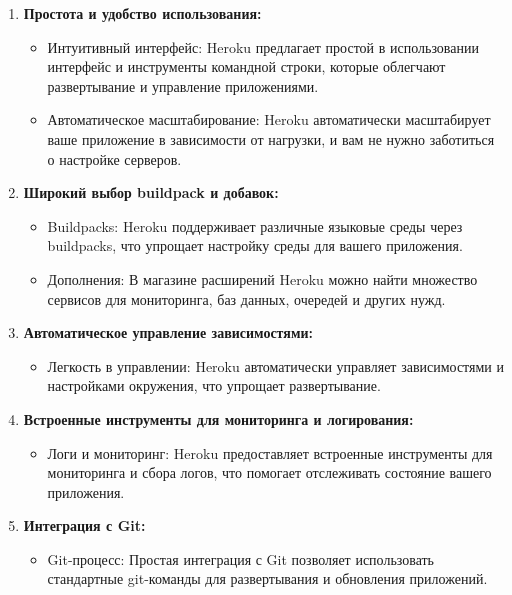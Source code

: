 \documentclass[
]{book}
\providecommand{\tightlist}{%
  \setlength{\itemsep}{0pt}\setlength{\parskip}{0pt}}
\begin{document}
\begin{enumerate}
\def\labelenumi{\arabic{enumi}.}
\tightlist
\item
  \textbf{Простота и удобство использования:}

  \begin{itemize}
  \tightlist
  \item
    Интуитивный интерфейс: Heroku предлагает простой в использовании интерфейс и инструменты командной строки, которые облегчают развертывание и управление приложениями.
  \item
    Автоматическое масштабирование: Heroku автоматически масштабирует ваше приложение в зависимости от нагрузки, и вам не нужно заботиться о настройке серверов.
  \end{itemize}
\item
  \textbf{Широкий выбор buildpack и добавок:}

  \begin{itemize}
  \tightlist
  \item
    Buildpacks: Heroku поддерживает различные языковые среды через buildpacks, что упрощает настройку среды для вашего приложения.
  \item
    Дополнения: В магазине расширений Heroku можно найти множество сервисов для мониторинга, баз данных, очередей и других нужд.
  \end{itemize}
\item
  \textbf{Автоматическое управление зависимостями:}

  \begin{itemize}
  \tightlist
  \item
    Легкость в управлении: Heroku автоматически управляет зависимостями и настройками окружения, что упрощает развертывание.
  \end{itemize}
\item
  \textbf{Встроенные инструменты для мониторинга и логирования:}

  \begin{itemize}
  \tightlist
  \item
    Логи и мониторинг: Heroku предоставляет встроенные инструменты для мониторинга и сбора логов, что помогает отслеживать состояние вашего приложения.
  \end{itemize}
\item
  \textbf{Интеграция с Git:}

  \begin{itemize}
  \tightlist
  \item
    Git-процесс: Простая интеграция с Git позволяет использовать стандартные git-команды для развертывания и обновления приложений.
  \end{itemize}
\end{enumerate}
\end{document}
